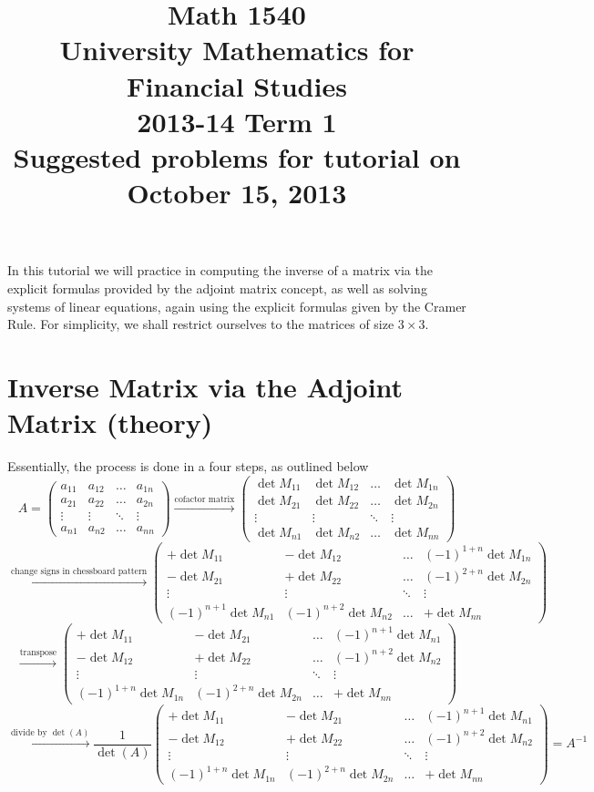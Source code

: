 \documentclass[8pt]{article} %
\title{Math 1540\\University Mathematics for Financial Studies\\2013-14 Term 1\\Suggested problems for tutorial on\\October 15, 2013}
\date{}
\begin{document}
\maketitle
In this tutorial we will practice in computing the inverse of a matrix via the explicit formulas provided by the adjoint matrix concept, as well as solving systems of linear
equations, again using the explicit formulas given by the Cramer Rule. For simplicity, we shall restrict ourselves to the matrices of size $3\times3$.

\section{Inverse Matrix via the Adjoint Matrix (theory)}
Essentially, the process is done in a four steps, as outlined below
\[A=\begin{pmatrix}a_{11}&a_{12}&\hdots&a_{1n}\\a_{21}&a_{22}&\hdots&a_{2n}\\\vdots&\vdots&\ddots&\vdots\\a_{n1}&a_{n2}&\hdots&a_{nn}\end{pmatrix}
	\xrightarrow{\text{cofactor matrix}}
	\begin{pmatrix}\det M_{11}&\det M_{12}&\hdots&\det M_{1n}\\\det M_{21}&\det M_{22}&
		\hdots&\det M_{2n}\\\vdots&\vdots&\ddots&\vdots\\\det M_{n1}&\det M_{n2}&\hdots&\det M_{nn}\end{pmatrix}\]
	\[\xrightarrow{\text{change signs in chessboard pattern}}
	\begin{pmatrix}+\det M_{11}&-\det M_{12}&\hdots&(-1)^{1+n}\det M_{1n}\\-\det M_{21}&+\det M_{22}&
		\hdots&(-1)^{2+n}\det M_{2n}\\\vdots&\vdots&\ddots&\vdots\\(-1)^{n+1}\det M_{n1}&(-1)^{n+2}\det M_{n2}&\hdots&+\det M_{nn}\end{pmatrix}
		\]
	\[\xrightarrow{\text{transpose}}
	\begin{pmatrix}+\det M_{11}&-\det M_{21}&\hdots&(-1)^{n+1}\det M_{n1}\\-\det M_{12}&+\det M_{22}&
		\hdots&(-1)^{n+2}\det M_{n2}\\\vdots&\vdots&\ddots&\vdots\\(-1)^{1+n}\det M_{1n}&(-1)^{2+n}\det M_{2n}&\hdots&+\det M_{nn}\end{pmatrix}
		\]
	\[\xrightarrow{\text{divide by $\det(A)$}}
	\frac{1}{\det(A)}\begin{pmatrix}+\det M_{11}&-\det M_{21}&\hdots&(-1)^{n+1}\det M_{n1}\\-\det M_{12}&+\det M_{22}&
		\hdots&(-1)^{n+2}\det M_{n2}\\\vdots&\vdots&\ddots&\vdots\\(-1)^{1+n}\det M_{1n}&(-1)^{2+n}\det M_{2n}&\hdots&+\det M_{nn}\end{pmatrix}
		=A^{-1}\]
\end{document}
